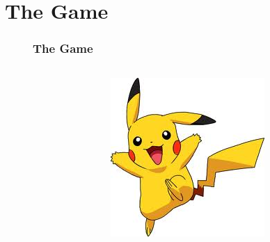 \documentclass{beamer}
\begin{document}
\section{The Game}
\begin{figure}
	\frametitle{The Game}
	\begin{columns}
		\begin{column}{0.5\linewidth}
			\tableofcontents[currentsection,subsectionstyle=show/show/hide]
		\end{column}
		\begin{column}{0.5\linewidth}
			\begin{figure}
				\begin{center}
					\includegraphics[width=\linewidth]{slides/images/pikachu.jpeg}
				\end{center}
			\end{figure}
		\end{column}
	\end{columns}
\end{figure}
\end{document}
